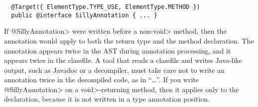 \documentclass[10pt]{article}
\newcommand{\ttlcb}{\texttt{\char "7B}}
\newcommand{\ttrcb}{\texttt{\char "7D}}
\begin{document}
\preverbnegspace
\begin{Verbatim}
  @Target({ ElementType.TYPE_USE, ElementType.METHOD })
  public @interface SillyAnnotation { ... }
\end{Verbatim}

\noindent
If \<@SillyAnnotation> were written before a non-\<void> method, then
the annotation would apply to both the return type and the
method declaration.  The annotation appears twice in the AST
during annotation processing, and it appears twice in the classfile.
A tool that reads a classfile and writes Java-like output, such as Javadoc
or a decompiler, must take care not to write an annotation twice in the
decompiled code, as in ``\ldots''.
If you write \<@SillyAnnotation> on a \<void>-returning method, then
it applies only to the declaration, because it is not written in a type
annotation position.
\end{document}
